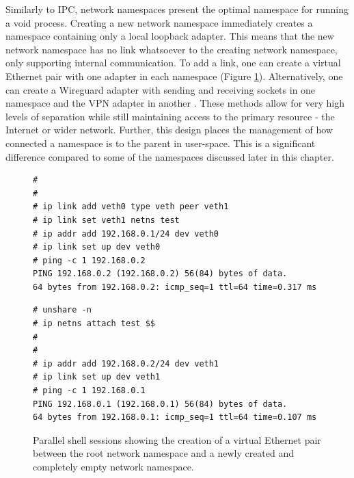\documentclass[12pt,a4paper,twoside]{report}
\begin{document}
Similarly to IPC, network namespaces present the optimal namespace for running a void process. Creating a new network namespace immediately creates a namespace containing only a local loopback adapter. This means that the new network namespace has no link whatsoever to the creating network namespace, only supporting internal communication. To add a link, one can create a virtual Ethernet pair with one adapter in each namespace (Figure \ref{fig:virtual-ethernet}). Alternatively, one can create a Wireguard adapter with sending and receiving sockets in one namespace and the VPN adapter in another \citep[§7.3]{donenfeld_wireguard_2017}. These methods allow for very high levels of separation while still maintaining access to the primary resource - the Internet or wider network. Further, this design places the management of how connected a namespace is to the parent in user-space. This is a significant difference compared to some of the namespaces discussed later in this chapter.

\begin{figure}
\begin{minipage}{.49\textwidth}

\begin{verbatim}
#
#
# ip link add veth0 type veth peer veth1
# ip link set veth1 netns test
# ip addr add 192.168.0.1/24 dev veth0
# ip link set up dev veth0
# ping -c 1 192.168.0.2
PING 192.168.0.2 (192.168.0.2) 56(84) bytes of data.
64 bytes from 192.168.0.2: icmp_seq=1 ttl=64 time=0.317 ms
\end{verbatim}

\end{minipage}\hfill
\begin{minipage}{.49\textwidth}

\begin{verbatim}
# unshare -n
# ip netns attach test $$
#
#
# ip addr add 192.168.0.2/24 dev veth1
# ip link set up dev veth1
# ping -c 1 192.168.0.1
PING 192.168.0.1 (192.168.0.1) 56(84) bytes of data.
64 bytes from 192.168.0.1: icmp_seq=1 ttl=64 time=0.107 ms
\end{verbatim}

\end{minipage}

\caption{Parallel shell sessions showing the creation of a virtual Ethernet pair between the root network namespace and a newly created and completely empty network namespace.}
\label{fig:virtual-ethernet}
\end{figure}
\end{document}
